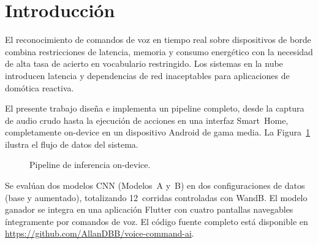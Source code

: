 \documentclass[conference]{IEEEtran}
\begin{document}
\section{Introducción}

El reconocimiento de comandos de voz en tiempo real sobre dispositivos de borde
combina restricciones de latencia, memoria y consumo energético con la necesidad
de alta tasa de acierto en vocabulario restringido.  Los sistemas en la nube
introducen latencia y dependencias de red inaceptables para aplicaciones de
domótica reactiva.

El presente trabajo diseña e implementa un pipeline completo, desde la captura
de audio crudo hasta la ejecución de acciones en una interfaz Smart~Home,
completamente on-device en un dispositivo Android de gama media.  La
Figura~\ref{fig:pipeline} ilustra el flujo de datos del sistema.

\begin{figure}[htbp]
\centering
{}
\caption{Pipeline de inferencia on-device.}
\label{fig:pipeline}
\end{figure}

Se evalúan dos modelos CNN (Modelos~A y~B) en dos configuraciones de datos
(base y aumentado), totalizando 12~corridas controladas con WandB.  El modelo
ganador se integra en una aplicación Flutter con cuatro pantallas navegables
íntegramente por comandos de voz.  El código fuente completo está disponible
en \url{https://github.com/AllanDBB/voice-command-ai}.
\end{document}

